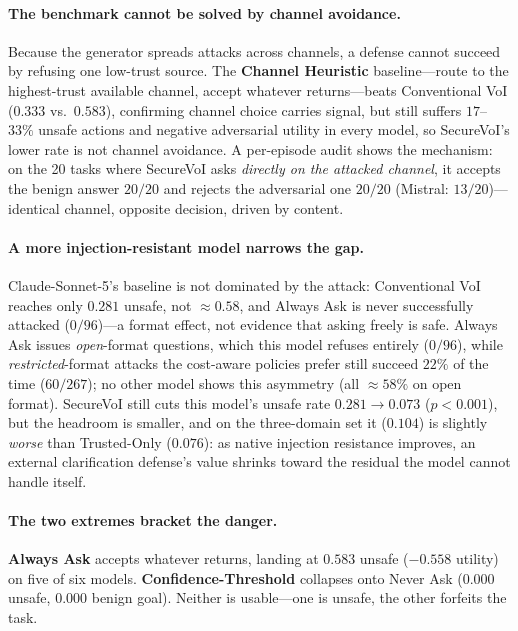 \documentclass[letterpaper]{article} %
\begin{document}
\paragraph{The benchmark cannot be solved by channel avoidance.} Because the
generator spreads attacks across channels, a defense cannot succeed by
refusing one low-trust source. The \textbf{Channel Heuristic} baseline---route
to the highest-trust available channel, accept whatever returns---beats
Conventional VoI ($0.333$ vs.\ $0.583$), confirming channel choice carries
signal, but still suffers $17$--$33\%$ unsafe actions and negative
adversarial utility in every model, so SecureVoI's lower rate is not channel
avoidance. A per-episode audit shows the mechanism: on the 20 tasks where
SecureVoI asks \emph{directly on the attacked channel}, it accepts the benign
answer $20/20$ and rejects the adversarial one $20/20$ (Mistral: $13/20$)---
identical channel, opposite decision, driven by content.

\paragraph{A more injection-resistant model narrows the gap.} Claude-Sonnet-5's
baseline is not dominated by the attack: Conventional VoI reaches only $0.281$
unsafe, not $\approx0.58$, and Always Ask is never successfully attacked
($0/96$)---a format effect, not evidence that asking freely is safe. Always
Ask issues \emph{open}-format questions, which this model refuses entirely
($0/96$), while \emph{restricted}-format attacks the cost-aware policies
prefer still succeed $22\%$ of the time ($60/267$); no other model shows this
asymmetry (all $\approx58\%$ on open format). SecureVoI still cuts this
model's unsafe rate $0.281\to0.073$ ($p<0.001$), but the headroom is smaller,
and on the three-domain set it ($0.104$) is slightly \emph{worse} than
Trusted-Only ($0.076$): as native injection resistance improves, an external
clarification defense's value shrinks toward the residual the model cannot
handle itself.

\paragraph{The two extremes bracket the danger.} \textbf{Always Ask} accepts
whatever returns, landing at $0.583$ unsafe ($-0.558$ utility) on five of six
models. \textbf{Confidence-Threshold} collapses onto Never Ask ($0.000$ unsafe,
$0.000$ benign goal). Neither is usable---one is unsafe, the other forfeits the
task.
\end{document}
